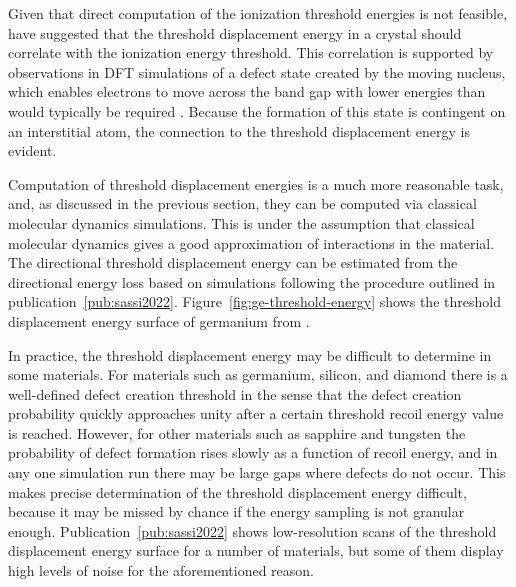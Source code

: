 Given that direct computation of the ionization threshold energies is not feasible, \textcite{KadribasicEtAl2018} have suggested that the threshold displacement energy in a crystal should correlate with the ionization energy threshold. This correlation is supported by observations in DFT simulations of a defect state created by the moving nucleus, which enables electrons to move across the band gap with lower energies than would typically be required \parencite{LimEtAl2016}. Because the formation of this state is contingent on an interstitial atom, the connection to the threshold displacement energy is evident.

Computation of threshold displacement energies is a much more reasonable task, and, as discussed in the previous section, they can be computed via classical molecular dynamics simulations. This is under the assumption that classical molecular dynamics gives a good approximation of interactions in the material. The directional threshold displacement energy can be estimated from the directional energy loss based on simulations following the procedure outlined in publication~\ref{pub:sassi2022}. Figure~\ref{fig:ge-threshold-energy} shows the threshold displacement energy surface of germanium from \textcite{KadribasicEtAl2018}. 

In practice, the threshold displacement energy may be difficult to determine in some materials. For materials such as germanium, silicon, and diamond there is a well-defined defect creation threshold in the sense that the defect creation probability quickly approaches unity after a certain threshold recoil energy value is reached. However, for other materials such as sapphire and tungsten the probability of defect formation rises slowly as a function of recoil energy, and in any one simulation run there may be large gaps where defects do not occur. This makes precise determination of the threshold displacement energy difficult, because it may be missed by chance if the energy sampling is not granular enough. Publication~\ref{pub:sassi2022} shows low-resolution scans of the threshold displacement energy surface for a number of materials, but some of them display high levels of noise for the aforementioned reason.

